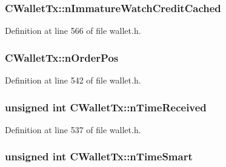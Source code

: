 \hypertarget{class_c_wallet_tx_afe7b93d5672df90c6b1d3065dc047fe0}{}
\subsubsection[{n\+Immature\+Watch\+Credit\+Cached}]{ C\+Wallet\+Tx\+::n\+Immature\+Watch\+Credit\+Cached\hspace{0.3cm}{\ttfamily [mutable]}}\label{class_c_wallet_tx_afe7b93d5672df90c6b1d3065dc047fe0}


Definition at line 566 of file wallet.\+h.

\hypertarget{class_c_wallet_tx_af51e160ff1d9d78986e9f239c7ac7a35}{}
\subsubsection[{n\+Order\+Pos}]{ C\+Wallet\+Tx\+::n\+Order\+Pos}\label{class_c_wallet_tx_af51e160ff1d9d78986e9f239c7ac7a35}


Definition at line 542 of file wallet.\+h.

\hypertarget{class_c_wallet_tx_af4f4b58875061467026da7b259532b69}{}
\subsubsection[{n\+Time\+Received}]{\setlength{\rightskip}{0pt plus 5cm}unsigned int C\+Wallet\+Tx\+::n\+Time\+Received}\label{class_c_wallet_tx_af4f4b58875061467026da7b259532b69}


Definition at line 537 of file wallet.\+h.

\hypertarget{class_c_wallet_tx_a3c9ba52ce7203b9f16235785a09c383c}{}
\subsubsection[{n\+Time\+Smart}]{\setlength{\rightskip}{0pt plus 5cm}unsigned int C\+Wallet\+Tx\+::n\+Time\+Smart}\label{class_c_wallet_tx_a3c9ba52ce7203b9f16235785a09c383c}


